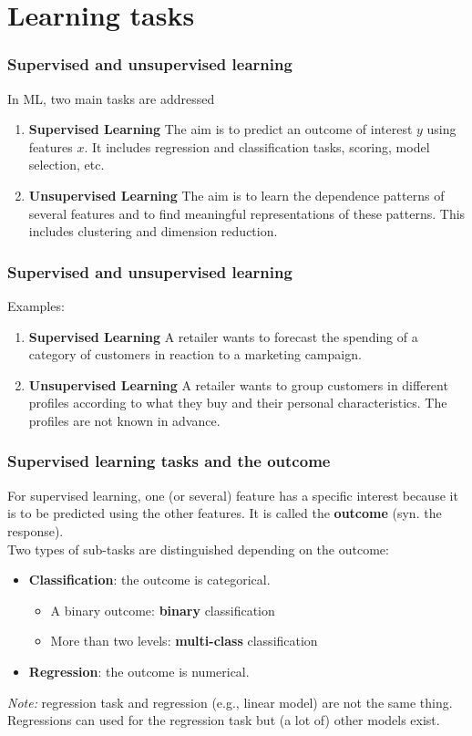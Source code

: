 \section{Learning tasks}
\begin{frame}
\frametitle{Supervised and unsupervised learning}
In ML, two main tasks are addressed 
\begin{enumerate}
\item {\bf Supervised Learning} The aim is to predict an outcome of interest $y$ using features $x$. It includes regression and classification tasks, scoring, model selection, etc.  
\item {\bf Unsupervised Learning} The aim is to learn the dependence patterns of several features and to find meaningful representations of these patterns. This includes clustering and dimension reduction.
\end{enumerate}
\end{frame}
\begin{frame}
\frametitle{Supervised and unsupervised learning}
Examples:
\begin{enumerate}
\item {\bf Supervised Learning} A retailer wants to forecast the spending of a category of customers in reaction to a marketing campaign. 
\item {\bf Unsupervised Learning} A retailer wants to group customers in different profiles according to what they buy and their personal characteristics. The profiles are not known in advance.
\end{enumerate}
\end{frame}
\begin{frame}
\frametitle{Supervised learning tasks and the outcome}
For supervised learning, one (or several) feature has a specific interest because it is to be predicted using the other features. It is called the {\bf outcome} (syn. the response).\\
\vspace{0.3cm}
Two types of sub-tasks are distinguished depending on the outcome:
\begin{itemize}
\item {\bf Classification}: the outcome is categorical.
\begin{itemize}
\item A binary outcome: {\bf binary} classification
\item More than two levels: {\bf multi-class} classification 
\end{itemize}
\item {\bf Regression}: the outcome is numerical.
\end{itemize}
{\it Note:} regression task and regression (e.g., linear model) are not the same thing. Regressions can used for the regression task but (a lot of) other models exist. 
\end{frame}
